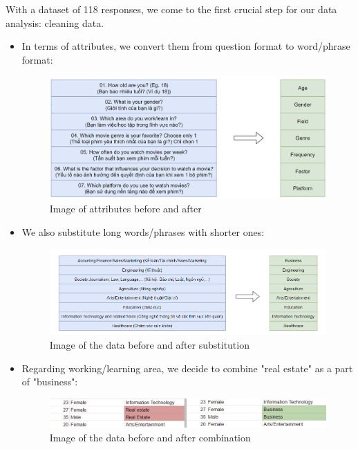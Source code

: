     With a dataset of 118 responses, we come to the first crucial step for our data analysis: cleaning data.
                \begin{itemize}
                    \item In terms of attributes, we convert them from question format to word/phrase format:
                        \begin{figure}[H]
                            \centering
                            \includegraphics[scale=0.45]{graphics/data/questiontophrase1.png}
                            \caption{Image of attributes before and after}
                        \end{figure}
                    
                    \item We also substitute long words/phrases with shorter ones:
                         \begin{figure}[H]
                            \centering
                            \includegraphics[scale=0.65]{graphics/data/substi.png}
                            \caption{Image of the data before and after substitution}
                        \end{figure}

                    \item Regarding working/learning area,  we decide to combine "real estate" as a part of "business":
                        \begin{figure}[H]
                            \centering
                            \includegraphics[scale=0.5]{graphics/data/realestate_business.jpg}
                            \caption{Image of the data before and after combination}
                        \end{figure}
                    

\end{itemize}
